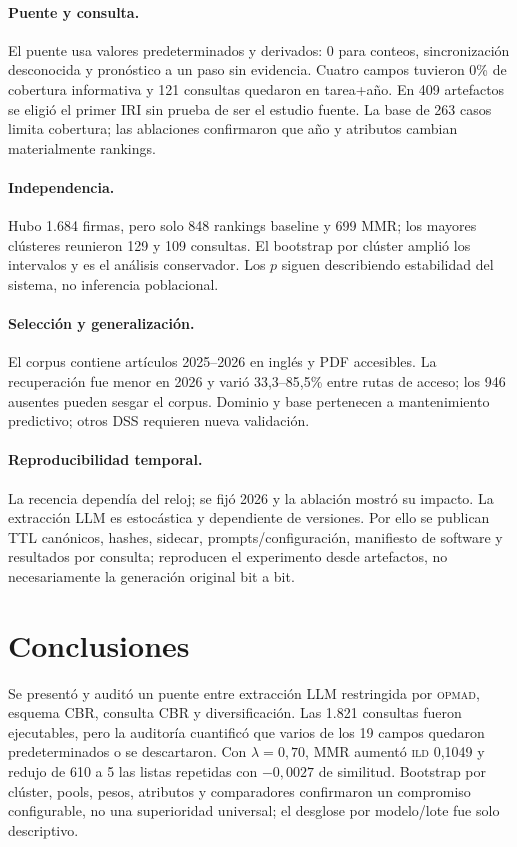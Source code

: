 \documentclass[11pt,a4paper]{article}
\newcommand{\OPMAD}{\textsc{opmad}}
\newcommand{\ILD}{\textsc{ild}}
\begin{document}
\paragraph{Puente y consulta.}
El puente usa valores predeterminados y derivados: 0 para conteos, sincronización desconocida y pronóstico a un paso sin evidencia. Cuatro campos tuvieron 0\% de cobertura informativa y 121 consultas quedaron en tarea+año. En 409 artefactos se eligió el primer IRI sin prueba de ser el estudio fuente. La base de 263 casos limita cobertura; las ablaciones confirmaron que año y atributos cambian materialmente rankings.

\paragraph{Independencia.}
Hubo 1.684 firmas, pero solo 848 rankings baseline y 699 MMR; los mayores clústeres reunieron 129 y 109 consultas. El bootstrap por clúster amplió los intervalos y es el análisis conservador. Los $p$ siguen describiendo estabilidad del sistema, no inferencia poblacional.

\paragraph{Selección y generalización.}
El corpus contiene artículos 2025--2026 en inglés y PDF accesibles. La recuperación fue menor en 2026 y varió 33,3--85,5\% entre rutas de acceso; los 946 ausentes pueden sesgar el corpus. Dominio y base pertenecen a mantenimiento predictivo; otros DSS requieren nueva validación.

\paragraph{Reproducibilidad temporal.}
La recencia dependía del reloj; se fijó 2026 y la ablación mostró su impacto. La extracción LLM es estocástica y dependiente de versiones. Por ello se publican TTL canónicos, hashes, sidecar, prompts/configuración, manifiesto de software y resultados por consulta; reproducen el experimento desde artefactos, no necesariamente la generación original bit a bit.

\section{Conclusiones}
\label{sec:conclusion}

Se presentó y auditó un puente entre extracción LLM restringida por \OPMAD{}, esquema CBR, consulta CBR y diversificación. Las 1.821 consultas fueron ejecutables, pero la auditoría cuantificó que varios de los 19 campos quedaron predeterminados o se descartaron. Con $\lambda=0{,}70$, MMR aumentó \ILD{} 0,1049 y redujo de 610 a 5 las listas repetidas con $-0,0027$ de similitud. Bootstrap por clúster, pools, pesos, atributos y comparadores confirmaron un compromiso configurable, no una superioridad universal; el desglose por modelo/lote fue solo descriptivo.
\end{document}
